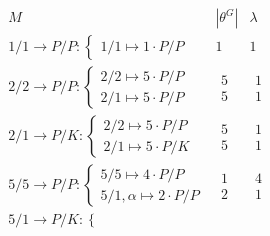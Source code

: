 \documentclass[12pt,a4paper]{amsart}
\begin{document}
\begin{align*}
\begin{array}{ccc}
  M&|\theta^G|&\lambda\\\hline
  1/1 \to P/P \colon \left\{
                \begin{array}{c}
                  1/1 \mapsto 1 \cdot P/P 
                \end{array}\right.
                & 1 & 1 \\ \hline
  2/2 \to P/P \colon \left\{
                \begin{array}{c}
                  2/2 \mapsto 5 \cdot P/P \\
                  2/1 \mapsto 5 \cdot P/P
                \end{array} \right.
              & \begin{array}{c} 5 \\ 5 \end{array}
              & \begin{array}{c} 1 \\ 1 \end{array}
\\
  2/1 \to P/K \colon \left\{
                \begin{array}{c}
                  2/2 \mapsto 5 \cdot P/P \\
                  2/1 \mapsto 5 \cdot P/K
                \end{array}\right.
              & \begin{array}{c} 5 \\ 5 \end{array}
              & \begin{array}{c} 1 \\ 1 \end{array}
\\ \hline
  5/5 \to P/P \colon \left\{
                \begin{array}{c}
                  5/5 \mapsto 4 \cdot P/P \\
                  5/1,\alpha \mapsto 2 \cdot P/P
                \end{array} \right.
              & \begin{array}{c} 1 \\ 2 \end{array}
              & \begin{array}{c} 4 \\ 1 \end{array}
\\
  5/1 \to P/K \colon \left\{
                \begin{array}{c}

\end{array}
\end{array}
\end{align*}
\end{document}

